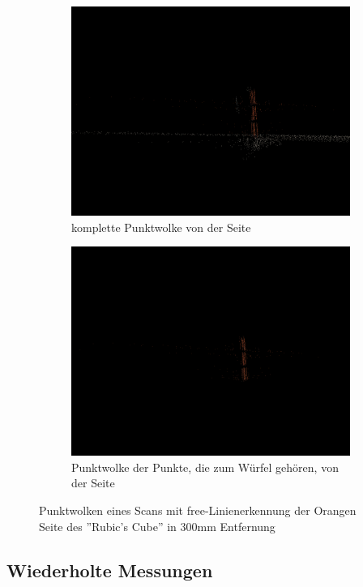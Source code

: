 \documentclass[ngerman,a4paper,parskip=half]{scrartcl}
\begin{document}
\begin{figure}[H]
\begin{subfigure}{0.45\textwidth}
		\includegraphics[width=\textwidth]{includes/free_orange_300_pos1.png}
		\caption{komplette Punktwolke von der Seite}
	\end{subfigure}
	\hfill
	\begin{subfigure}{0.45\textwidth}
		\includegraphics[width=\textwidth]{includes/free_only_orange_300_pos1.png}
		\caption{Punktwolke der Punkte, die zum Würfel gehören, von der Seite}
	\end{subfigure}
	\caption{Punktwolken eines Scans mit free-Linienerkennung der Orangen Seite des ''Rubic's Cube'' in 300mm Entfernung}
\end{figure}


\subsection{Wiederholte Messungen}
\label{sec:reps}
\end{document}
